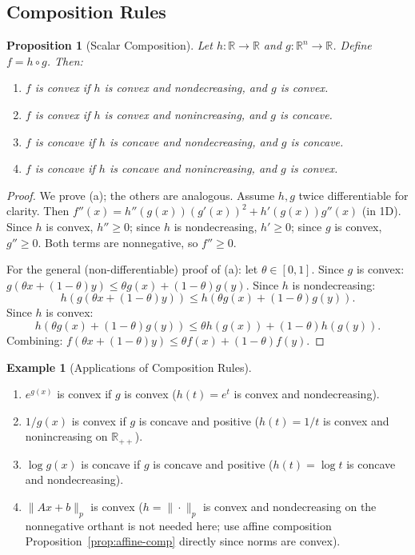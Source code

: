 \documentclass[11pt,a4paper]{article}
\newtheorem{proposition}[theorem]{Proposition}
\theoremstyle{definition}
\newtheorem{example}[theorem]{Example}
\theoremstyle{remark}
\newcommand{\R}{\mathbb{R}}
\begin{document}
\subsection{Composition Rules}

\begin{proposition}[Scalar Composition]
\label{prop:scalar-composition}
Let $h : \R \to \R$ and $g : \R^n \to \R$. Define $f = h \circ g$. Then:
\begin{enumerate}[label=(\alph*)]
  \item $f$ is convex if $h$ is convex and nondecreasing, and $g$ is convex.
  \item $f$ is convex if $h$ is convex and nonincreasing, and $g$ is concave.
  \item $f$ is concave if $h$ is concave and nondecreasing, and $g$ is concave.
  \item $f$ is concave if $h$ is concave and nonincreasing, and $g$ is convex.
\end{enumerate}
\end{proposition}

\begin{proof}
We prove (a); the others are analogous. Assume $h, g$ twice differentiable for
clarity. Then $f''(x) = h''(g(x))(g'(x))^2 + h'(g(x)) g''(x)$ (in 1D). Since $h$ is
convex, $h'' \ge 0$; since $h$ is nondecreasing, $h' \ge 0$; since $g$ is convex,
$g'' \ge 0$. Both terms are nonnegative, so $f'' \ge 0$.

For the general (non-differentiable) proof of (a): let $\theta \in [0,1]$. Since $g$
is convex: $g(\theta x + (1-\theta) y) \le \theta g(x) + (1-\theta) g(y)$. Since $h$
is nondecreasing:
\[
  h(g(\theta x + (1-\theta) y)) \le h(\theta g(x) + (1-\theta) g(y)).
\]
Since $h$ is convex:
\[
  h(\theta g(x) + (1-\theta) g(y)) \le \theta h(g(x)) + (1-\theta) h(g(y)).
\]
Combining: $f(\theta x + (1-\theta)y) \le \theta f(x) + (1-\theta) f(y)$.
\end{proof}

\begin{example}[Applications of Composition Rules]
\label{ex:composition-apps}
\begin{enumerate}[label=(\alph*)]
  \item $e^{g(x)}$ is convex if $g$ is convex ($h(t) = e^t$ is convex and
        nondecreasing).
  \item $1/g(x)$ is convex if $g$ is concave and positive ($h(t) = 1/t$ is convex and
        nonincreasing on $\R_{++}$).
  \item $\log g(x)$ is concave if $g$ is concave and positive ($h(t) = \log t$ is
        concave and nondecreasing).
  \item $\|Ax + b\|_p$ is convex ($h = \|\cdot\|_p$ is convex and nondecreasing on
        the nonnegative orthant is not needed here; use affine composition
        Proposition~\ref{prop:affine-comp} directly since norms are convex).
\end{enumerate}
\end{example}
\end{document}
